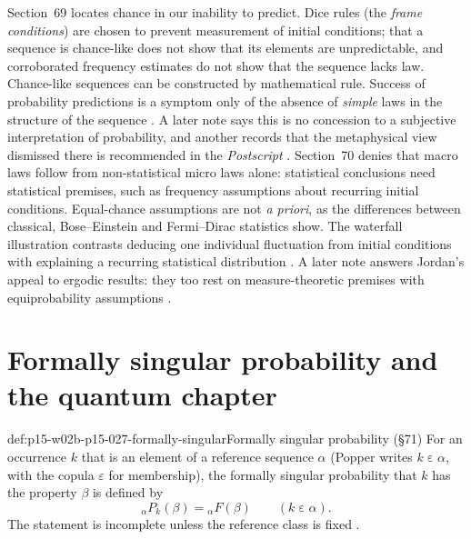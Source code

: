 Section~69 locates chance in our inability to predict. Dice rules (the
\emph{frame conditions}) are chosen to prevent measurement of initial
conditions; that a sequence is chance-like does not show that its
elements are unpredictable, and corroborated frequency estimates do not
show that the sequence lacks law. Chance-like sequences can be
constructed by mathematical rule. Success of probability predictions is a
symptom only of the absence of \emph{simple} laws in the structure of the
sequence \parencite[\S69]{Popper2002LogicDiscoveryUI}. A later note
says this is no concession to a subjective interpretation of
probability, and another records that the metaphysical view dismissed
there is recommended in the \emph{Postscript}
\parencite[\S69, notes~*1, *2]{Popper2002LogicDiscoveryUI}.
Section~70 denies that macro laws follow from non-statistical micro laws
alone: statistical conclusions need statistical premises, such as
frequency assumptions about recurring initial conditions. Equal-chance
assumptions are not \emph{a priori}, as the differences between
classical, Bose--Einstein and Fermi--Dirac statistics show. The waterfall
illustration contrasts deducing one individual fluctuation from initial
conditions with explaining a recurring statistical distribution
\parencite[\S70]{Popper2002LogicDiscoveryUI}. A later note answers
Jordan's appeal to ergodic results: they too rest on measure-theoretic
premises with equiprobability assumptions
\parencite[\S70, note~*1]{Popper2002LogicDiscoveryUI}.

\section{Formally singular probability and the quantum chapter}
\label{sec:p15-w02b-p15-027-quantum}

\begin{hbdefinition}{def:p15-w02b-p15-027-formally-singular}{Formally singular probability (\S71)}
For an occurrence \(k\) that is an element of a reference sequence
\(\alpha\) (Popper writes \(k\mathrel{\varepsilon}\alpha\), with the
copula \(\varepsilon\) for membership), the formally singular probability
that \(k\) has the property \(\beta\) is defined by
\[
 {}_{\alpha}P_k(\beta)={}_{\alpha}F(\beta)\qquad(k\mathrel{\varepsilon}\alpha).
\]
The statement is incomplete unless the reference class is fixed
\parencite[\S71]{Popper2002LogicDiscoveryUI}.
\end{hbdefinition}

